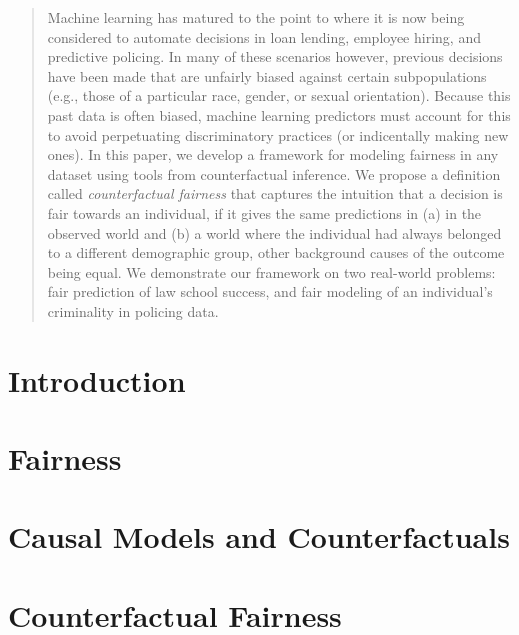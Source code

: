 \documentclass{article}
\begin{document}

\begin{abstract} 
  Machine learning has matured to the point to where it is now being considered to
  automate decisions in loan lending, employee hiring, and predictive policing.
  In many of these scenarios however, previous decisions have been made that are unfairly biased
  against certain subpopulations (e.g., those of a particular race,
  gender, or sexual orientation).  Because this past data is often
  biased, machine learning predictors must account for this to avoid perpetuating
  discriminatory practices (or indicentally making new ones).  In this paper, we develop a
  framework for modeling fairness in any dataset using tools from
  counterfactual inference. We propose a definition called
  \emph{counterfactual fairness} that captures the intuition
  that a decision is fair towards an individual, if it gives the same
  predictions in (a) in the observed world and (b) a world where the
  individual had always belonged to a different demographic group,
  other background causes of the outcome being equal. We demonstrate 
  our framework on two real-world problems: fair
  prediction of law school success, and fair modeling of an
  individual's criminality in policing data.
\end{abstract} 

\section{Introduction}
\label{introduction}


\section{Fairness}
\label{sec:related}


\section{Causal Models and Counterfactuals}
\label{background}


\section{Counterfactual Fairness}
\label{sec:count_fair}

\end{document}
